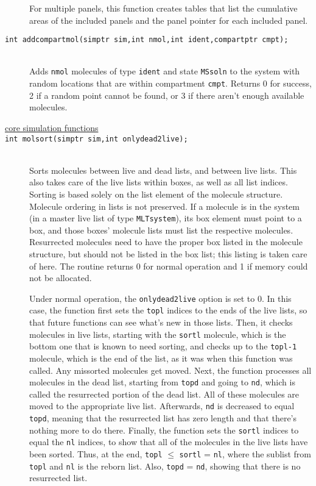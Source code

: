 \documentclass {scrbook}
\newcommand {\ttt} {\texttt}
\begin{document}
\begin{description}
For multiple panels, this function creates tables that list the cumulative areas of the included panels and the panel pointer for each included panel.

\item[\ttt{int addcompartmol(simptr sim,int nmol,int ident,compartptr cmpt);}]
\hfill \\
Adds \ttt{nmol} molecules of type \ttt{ident} and state \ttt{MSsoln} to the system with random locations that are within compartment \ttt{cmpt}. Returns 0 for success, 2 if a random point cannot be found, or 3 if there aren't enough available molecules.

\item[\underline{core simulation functions}]

\item[\ttt{int molsort(simptr sim,int onlydead2live);}]
\hfill \\
Sorts molecules between live and dead lists, and between live lists. This also takes care of the live lists within boxes, as well as all list indices. Sorting is based solely on the list element of the molecule structure. Molecule ordering in lists is not preserved. If a molecule is in the system (in a master live list of type \ttt{MLTsystem}), its box element must point to a box, and those boxes' molecule lists must list the respective molecules. Resurrected molecules need to have the proper box listed in the molecule structure, but should not be listed in the box list; this listing is taken care of here. The routine returns 0 for normal operation and 1 if memory could not be allocated.

Under normal operation, the \ttt{onlydead2live} option is set to 0. In this case, the function first sets the \ttt{topl} indices to the ends of the live lists, so that future functions can see what's new in those lists. Then, it checks molecules in live lists, starting with the \ttt{sortl} molecule, which is the bottom one that is known to need sorting, and checks up to the \ttt{topl-1} molecule, which is the end of the list, as it was when this function was called. Any missorted molecules get moved. Next, the function processes all molecules in the dead list, starting from \ttt{topd} and going to \ttt{nd}, which is called the resurrected portion of the dead list. All of these molecules are moved to the appropriate live list. Afterwards, \ttt{nd} is decreased to equal \ttt{topd}, meaning that the resurrected list has zero length and that there's nothing more to do there. Finally, the function sets the \ttt{sortl} indices to equal the \ttt{nl} indices, to show that all of the molecules in the live lists have been sorted. Thus, at the end, \ttt{topl} $\leq$ \ttt{sortl} = \ttt{nl}, where the sublist from \ttt{topl} and \ttt{nl} is the reborn list. Also, \ttt{topd} = \ttt{nd}, showing that there is no resurrected list.


\end{description}
\end{document}
